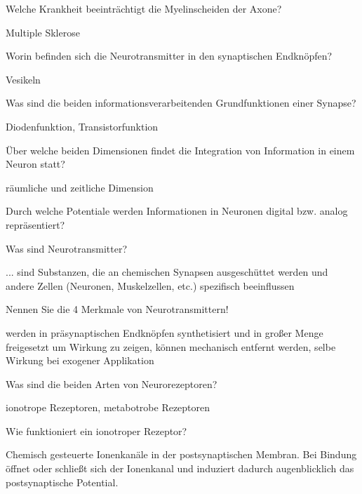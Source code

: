 \documentclass[10pt, a4paper]{exam}
\begin{document}
\begin{questions}
  \question Welche Krankheit beeinträchtigt die Myelinscheiden der Axone?
  \begin{solution}
    Multiple Sklerose
  \end{solution}

  \question Worin befinden sich die Neurotransmitter in den synaptischen Endknöpfen?
  \begin{solution}
    Vesikeln
  \end{solution}

  \question Was sind die beiden informationsverarbeitenden Grundfunktionen einer Synapse?
  \begin{solution}
    Diodenfunktion, Transistorfunktion
  \end{solution}

  \question Über welche beiden Dimensionen findet die Integration von Information in einem Neuron statt?
  \begin{solution}
    räumliche und zeitliche Dimension
  \end{solution}

  \question Durch welche Potentiale werden Informationen in Neuronen digital bzw. analog repräsentiert?
  \begin{solution}

  \end{solution}

  \question Was sind Neurotransmitter?
  \begin{solution}
    ... sind Substanzen, die an chemischen Synapsen ausgeschüttet werden und andere Zellen (Neuronen, Muskelzellen, etc.) spezifisch beeinflussen
  \end{solution}

  \question Nennen Sie die 4 Merkmale von Neurotransmittern!
  \begin{solution}
    werden in präsynaptischen Endknöpfen synthetisiert und in großer Menge freigesetzt um Wirkung zu zeigen, können mechanisch entfernt werden, selbe Wirkung bei exogener Applikation
  \end{solution}

  \question Was sind die beiden Arten von Neurorezeptoren?
  \begin{solution}
    ionotrope Rezeptoren, metabotrobe Rezeptoren
  \end{solution}

  \question Wie funktioniert ein ionotroper Rezeptor?
  \begin{solution}
    Chemisch gesteuerte Ionenkanäle in der postsynaptischen Membran. Bei Bindung öffnet oder schließt sich der Ionenkanal und induziert dadurch augenblicklich das postsynaptische Potential.
  \end{solution}


\end{questions}
\end{document}
